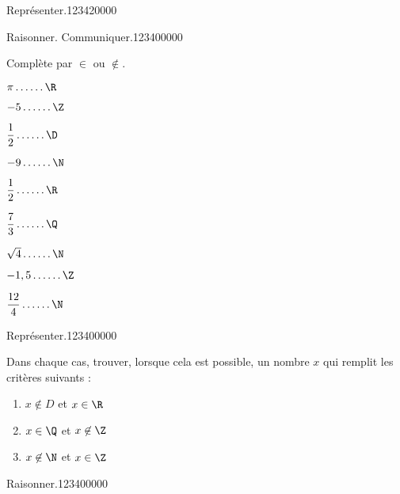 \begin{pageAD}
\begin{ExoCad}{Représenter.}{1234}{2}{0}{0}{0}{0}
\end{ExoCad}


  
\begin{ExoCad}{Raisonner. Communiquer.}{1234}{0}{0}{0}{0}{0}

Complète par  $\in$ ou $\notin$.

\begin{enumerate}
\begin{minipage}{0.32\linewidth}
\item $\pi \ldots \ldots \R$
\item $-5 \ldots \ldots \Z$
\item $\dfrac{1}{2} \ldots \ldots \D$
\end{minipage}
\hfill
\begin{minipage}{0.32\linewidth}
\item $-9 \ldots \ldots \N$
\item $\dfrac{1}{2}  \ldots \ldots \R$
\item $\dfrac{7}{3}  \ldots \ldots \Q$
\end{minipage}
\hfill
\begin{minipage}{0.32\linewidth}
\item $\sqrt{4} \ldots \ldots \N$
\item $-1,5 \ldots \ldots \Z$
\item $\dfrac{12}{4}  \ldots \ldots \N$
\end{minipage}
\end{enumerate}
 
\end{ExoCad}
 
 
 
\begin{ExoCad}{Représenter.}{1234}{0}{0}{0}{0}{0}

Dans chaque cas, trouver, lorsque cela est possible, un nombre $x$ qui remplit les critères suivants :
 
\begin{enumerate}[leftmargin=*]
\item $x \not\in D$ et $x \in \R$  
\item $x \in \Q$ et $x \not\in \Z$  
\item $x \not\in \N$ et $x \in \Z$  
\end{enumerate}
 
 \end{ExoCad}
 
\begin{ExoCad}{Raisonner.}{1234}{0}{0}{0}{0}{0}


\end{ExoCad}
\end{pageAD}
